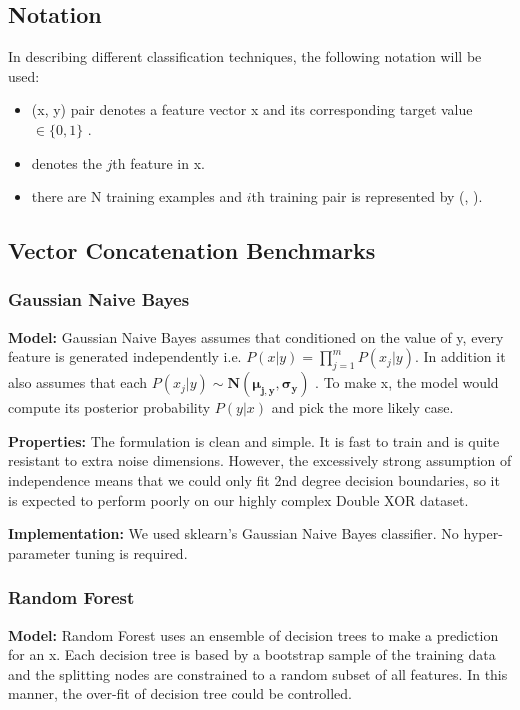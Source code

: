 \documentclass{article}
\begin{document}
\subsection*{Notation}
In describing different classification techniques, the following notation will
be used:
\begin{itemize}
\setlength\itemsep{0em}
\item (x, y) pair denotes a feature vector x \mmin {} and its
    corresponding target value $\in \{0, 1\}$ .
\item {} denotes the $j$th feature in x.
\item there are N training examples and $i$th training pair is represented by
    (,  ).
\end{itemize}


\subsection*{Vector Concatenation Benchmarks}

\subsubsection*{Gaussian Naive Bayes}
\textbf{Model:}
Gaussian Naive Bayes assumes that conditioned on the value of y, every feature
 is generated independently i.e. $P(x|y) = \prod_{j=1}^{m} P(x_j|y)$. In
addition it also assumes that each $P(x_j|y) \sim \mathbf{N(\mu_{j,y},
    \sigma_y)}$ . To make x, the model would compute its posterior probability
$P(y|x)$ and pick the more likely case.

\textbf{Properties:}
The formulation is clean and simple. It is fast to train and is quite resistant
to extra noise dimensions. However, the excessively strong assumption of
independence means that we could only fit 2nd degree decision boundaries, so it
is expected to perform poorly on our highly complex Double XOR dataset.

\textbf{Implementation:}
We used sklearn's Gaussian Naive Bayes classifier. No hyper-parameter tuning is
required.

\subsubsection*{Random Forest}
\textbf{Model:}
Random Forest uses an ensemble of decision trees to make a prediction for an x.
Each decision tree is based by a bootstrap sample of the training data and the
splitting nodes are constrained to a random subset of all features. In this
manner, the over-fit of decision tree could be controlled.
\end{document}
